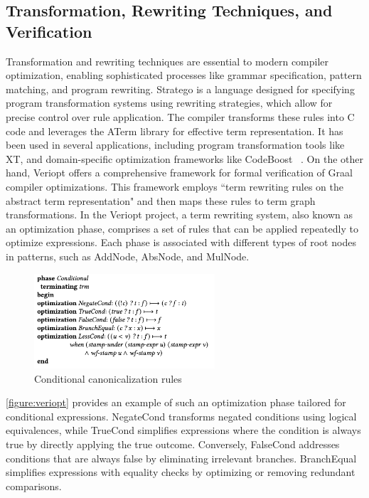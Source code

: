 \subsection{Transformation, Rewriting Techniques, and Verification}
Transformation and rewriting techniques are essential to modern compiler optimization, enabling sophisticated processes like grammar specification, pattern matching, and program rewriting. Stratego \cite{Eelco2001} is a language designed for specifying program transformation systems using rewriting strategies, which allow for precise control over rule application. The compiler transforms these rules into C code and leverages the ATerm library for effective term representation. It has been used in several applications, including program transformation tools like XT, and domain-specific optimization frameworks like CodeBoost ~\cite{Eelco2001}. On the other hand, Veriopt \cite{Webb2023} offers a comprehensive framework for formal verification of Graal compiler optimizations. This framework employs  ``term rewriting rules on the abstract term representation" \cite{Webb2023} and then maps these rules to term graph transformations. In the Veriopt project, a term rewriting system, also known as an optimization phase, comprises a set of rules that can be applied repeatedly to optimize expressions. Each phase is associated with different types of root nodes in patterns, such as AddNode, AbsNode, and MulNode. 

\begin{figure}[h]
    \centering
    \includegraphics[width=0.6\textwidth]{Packages/veriopt.png}
    \caption{Conditional canonicalization rules \cite{Webb2023}}
    \label{figure:veriopt}
\end{figure}

\newpage
\autoref{figure:veriopt} provides an example of such an optimization phase tailored for conditional expressions. NegateCond transforms negated conditions using logical equivalences, while TrueCond simplifies expressions where the condition is always true by directly applying the true outcome. Conversely, FalseCond addresses conditions that are always false by eliminating irrelevant branches. BranchEqual simplifies expressions with equality checks by optimizing or removing redundant comparisons.

